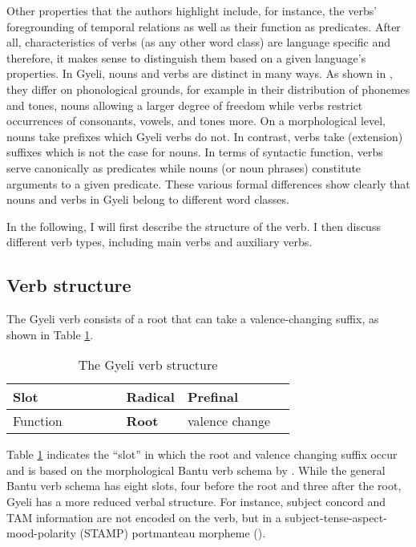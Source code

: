 \noindent Other properties that the authors highlight include, for instance, the verbs' foregrounding of temporal relations as well as their function as predicates. After all, characteristics of verbs (as any other word class) are language specific and therefore, it makes sense to distinguish them based on a given language's properties. In Gyeli, nouns and verbs are distinct in many ways. As shown in , they differ on phonological grounds, for example in their distribution of phonemes and tones, nouns allowing a larger degree of freedom while verbs restrict occurrences of consonants, vowels, and tones more. On a morphological level, nouns take prefixes which Gyeli verbs do not. In contrast, verbs take (extension) suffixes which is not the case for nouns. In terms of syntactic function, verbs serve canonically as predicates while nouns (or noun phrases) constitute arguments to a given predicate. These various formal differences show clearly that nouns and verbs in Gyeli belong to different word classes.

In the following, I will first describe the structure of the verb.  I then discuss different verb types, including main verbs and auxiliary verbs. 




\subsection{Verb structure}
\label{sec:StructVerb}

The Gyeli verb consists of a root that can take a valence-changing suffix, as shown in Table  \ref{Tab:Gyeliverb}.

\begin{table} 
\centering
\setlength{\tabcolsep}{3pt}
\begin{tabular}{|l|p{16mm}p{16mm}p{16mm}p{16mm}lp{16mm}p{16mm}|}
 \midrule %
Slot &  &  &  &  & {\bfseries Radical} & Prefinal &   \\ %
 \midrule %
Function &  &  &  &  & {\bfseries Root} & valence change &   \\
 \midrule
\end{tabular}
\caption{The Gyeli verb structure}
\label{Tab:Gyeliverb}
\end{table}

Table \ref{Tab:Gyeliverb} indicates the ``slot'' in which the root and valence changing suffix occur and is based on the morphological Bantu verb schema by \citet[184]{gueldemann2003}. While the general Bantu verb schema has eight slots, four before the root and three after the root, Gyeli has a more reduced verbal structure. For instance, subject concord and TAM information are not encoded on the verb, but in a subject-tense-aspect-mood-polarity (STAMP) portmanteau morpheme (). 

